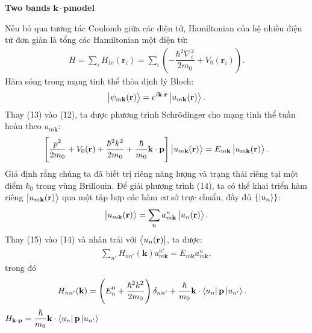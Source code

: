 \documentclass{report}
\newcommand{\f}[2]{\dfrac{#1}{#2}}
\begin{document}
\clearpage
\textbf{Two bands} $\mathbf{k\cdot p}$\;\textbf{model}

Nếu bỏ qua tương tác Coulomb giữa các điện tử, Hamiltonian của hệ nhiều điện tử đơn giản là tổng các Hamiltonian một điện tử:
\begin{align}
	H = \sum_i H_{1e}(\mathbf{r}_i) = \sum_i \left(-\f{\hbar^2 \nabla_i^2}{2m_0} + V_0(\mathbf{r}_i) \right).
\end{align}
Hàm sóng trong mạng tinh thể thỏa định lý Bloch:
\begin{align}
	\ket{\psi_{m\mathbf{k}}(\mathbf{r})} = e^{i\mathbf{k \cdot r}} \ket{u_{m\mathbf{k}}(\mathbf{r})}.
\end{align}
Thay (13) vào (12), ta được phương trình Schr\"{o}dinger cho mạng tinh thể tuần hoàn theo $u_{m\mathbf{k}}$:
\begin{align}
	\left[ \f{p^2}{2m_0} + V_0(\mathbf{r}) + \f{\hbar^2 k^2}{2m_0} + \f{\hbar}{m_0} \mathbf{k\cdot p} \right] \ket{u_{m\mathbf{k}}(\mathbf{r})} = E_{m\mathbf{k}} \ket{u_{m\mathbf{k}}(\mathbf{r})}.
\end{align}
Giả định rằng chúng ta đã biết trị riêng năng lượng và trạng thái riêng tại một điểm $k_0$ trong vùng Brillouin. Để giải phương trình (14), ta có thể khai triển hàm riêng $\ket{u_{m\mathbf{k}}(\mathbf{r})}$ qua một tập hợp các hàm cơ sở trực chuẩn, đầy đủ $\{\ket{u_n}\}$:
\begin{align}
	\ket{u_{m\mathbf{k}}(\mathbf{r})} = \sum_n a_{m\mathbf{k}}^{n} \ket{u_{n}(\mathbf{r})}.
\end{align}
Thay (15) vào (14) và nhân trái với $\bra{u_{n}(\mathbf{r})}$, ta được:
\begin{align}
	\sum_{n'} H_{nn'}(\mathbf{k}) a_{m\mathbf{k}}^{n'} = E_{m\mathbf{k}} a_{m\mathbf{k}}^{n}  ,
\end{align}
trong đó
\begin{align}
	H_{nn'}(\mathbf{k})
	 & = \left(E_n^0 + \f{\hbar^2 k^2}{2m_0} \right)\delta_{nn'} + \f{\hbar}{m_0} \mathbf{k}\cdot \bra{u_{n}}\mathbf{p}\ket{u_{n'}}.
\end{align}
$H_{\mathbf{k\cdot p}} = \f{\hbar}{m_0} \mathbf{k}\cdot \bra{u_{n}}\mathbf{p}\ket{u_{n'}}$
\end{document}

